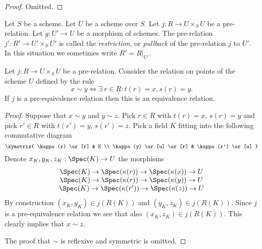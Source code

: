 \begin{proof}
Omitted.
\end{proof}

\begin{definition}
\label{definition-restrict-relation}
Let $S$ be a scheme.
Let $U$ be a scheme over $S$.
Let $j : R \to U \times_S U$ be a pre-relation.
Let $g : U' \to U$ be a morphism of schemes.
The pre-relation $j' : R' \to U' \times_S U'$ is called
the {\it restriction}, or {\it pullback} of the pre-relation $j$ to $U'$.
In this situation we sometimes write $R' = R|_{U'}$.
\end{definition}

\begin{lemma}
\label{lemma-pre-equivalence-equivalence-relation-points}
Let $j : R \to U \times_S U$ be a pre-relation.
Consider the relation on points of the scheme $U$ defined by
the rule
$$
x \sim y
\Leftrightarrow
\exists\ r \in R :
t(r) = x,
s(r) = y.
$$
If $j$ is a pre-equivalence relation then this is an
equivalence relation.
\end{lemma}

\begin{proof}
Suppose that $x \sim y$ and $y \sim z$.
Pick $r \in R$ with $t(r) = x$, $s(r) = y$ and
pick $r' \in R$ with $t(r') = y$, $s(r') = z$.
Pick a field $K$ fitting into the following commutative
diagram
$$
\xymatrix{
\kappa(r) \ar[r] & K \\
\kappa(y) \ar[u] \ar[r] & \kappa(r') \ar[u]
}
$$
Denote $x_K, y_K, z_K : \Spec(K) \to U$
the morphisms
$$
\begin{matrix}
\Spec(K) \to \Spec(\kappa(r))
\to
\Spec(\kappa(x)) \to U \\
\Spec(K) \to \Spec(\kappa(r))
\to
\Spec(\kappa(y)) \to U \\
\Spec(K) \to \Spec(\kappa(r'))
\to
\Spec(\kappa(z)) \to U
\end{matrix}
$$
By construction $(x_K, y_K) \in j(R(K))$ and
$(y_K, z_K) \in j(R(K))$. Since $j$ is a pre-equivalence relation
we see that also $(x_K, z_K) \in j(R(K))$.
This clearly implies that $x \sim z$.

\medskip\noindent
The proof that $\sim$ is reflexive and symmetric is omitted.
\end{proof}















